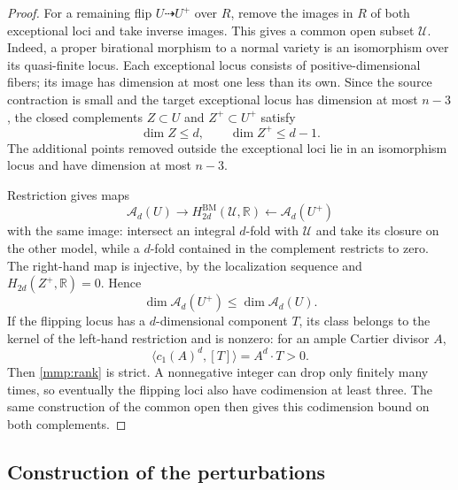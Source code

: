 \begin{proof}
For a remaining flip $U\dashrightarrow U^+$ over $R$, remove the
images in $R$ of both exceptional loci and take inverse images.
This gives a common open subset $\mathcal U$.  Indeed, a proper
birational morphism to a normal variety is an isomorphism over its
quasi-finite locus.  Each exceptional locus consists of
positive-dimensional fibers; its image has dimension at most one
less than its own.  Since the source contraction is small and the
target exceptional locus has dimension at most $n-3$, the closed
complements $Z\subset U$ and $Z^+\subset U^+$ satisfy
\[
 \dim Z\leq d,\qquad \dim Z^+\leq d-1.
\]
The additional points removed outside the exceptional loci lie in
an isomorphism locus and have dimension at most $n-3$.

Restriction gives maps
\[
 \mathcal A_d(U)\longrightarrow
 H^{\mathrm{BM}}_{2d}(\mathcal U,\mathbb R)
 \longleftarrow\mathcal A_d(U^+)
\]
with the same image: intersect an integral $d$-fold with
$\mathcal U$ and take its closure on the other model, while a
$d$-fold contained in the complement restricts to zero.
The right-hand map is injective, by the localization sequence and
$H_{2d}(Z^+,\mathbb R)=0$.
Hence
\begin{equation}\label{mmp:rank}
 \dim\mathcal A_d(U^+)\leq\dim\mathcal A_d(U).
\end{equation}
If the flipping locus has a $d$-dimensional component $T$, its
class belongs to the kernel of the left-hand restriction and is
nonzero: for an ample Cartier divisor $A$,
\[
 \langle c_1(A)^d,[T]\rangle=A^d\cdot T>0.
\]
Then \eqref{mmp:rank} is strict.  A nonnegative integer can drop only
finitely many times, so eventually the flipping loci also have
codimension at least three.  The same construction of the common
open then gives this codimension bound on both complements.
\end{proof}

\subsection{Construction of the perturbations}

